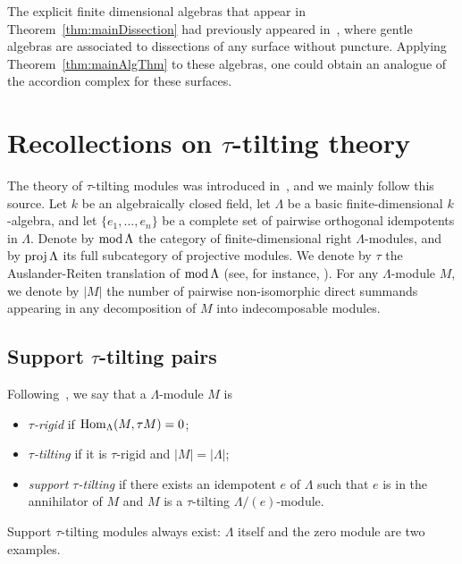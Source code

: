 \documentclass{amsart}
\theoremstyle{definition}
\newcommand{\darkblue}{\color{darkblue}} %
\newcommand{\defn}[1]{\textsl{\darkblue #1}} %
\newcommand{\MOD}{\mbox{{\rm mod \!}}}
\newcommand{\proj}{\operatorname{{\rm proj }}}
\newcommand{\Hom}[1]{\operatorname{{\rm Hom}}_{#1}}
\begin{document}
The explicit finite dimensional algebras that appear in Theorem~\ref{thm:mainDissection} had previously appeared in~\cite{DavidRoeslerSchiffler, DavidRoesler}, where gentle algebras are associated to dissections of any surface without puncture. Applying Theorem~\ref{thm:mainAlgThm} to these algebras, one could obtain an analogue of the accordion complex for these surfaces.



\section{Recollections on $\tau$-tilting theory}
\label{sec:recollections}

\enlargethispage{.1cm}
The theory of $\tau$-tilting modules was introduced in~\cite{AdachiIyamaReiten}, and we mainly follow this source.
Let $k$ be an algebraically closed field, let $\Lambda$ be a basic finite-dimensional $k$-algebra, 
and let $\{e_1, \dots, e_n\}$ be a complete set of pairwise orthogonal idempotents in $\Lambda$.
Denote by $\MOD \Lambda$ the category of finite-dimensional right $\Lambda$-modules, 
and by $\proj \Lambda$ its full subcategory of projective modules.
We denote by $\tau$ the Auslander-Reiten translation of $\MOD \Lambda$ (see, for instance, \cite[Chapter IV]{AssemSimsonSkowronski}).
For any $\Lambda$-module $M$, we denote by $|M|$ the number of pairwise non-isomorphic direct summands appearing 
in any decomposition of $M$ into indecomposable modules.


\subsection{Support $\tau$-tilting pairs}

Following~\cite[Def.~0.1]{AdachiIyamaReiten}, we say that a $\Lambda$-module $M$ is 
\begin{itemize}
 \item \defn{$\tau$-rigid} if $\Hom{\Lambda}(M, \tau M) = 0$;
 \item \defn{$\tau$-tilting} if it is $\tau$-rigid and $|M|=|\Lambda|$;
 \item \defn{support $\tau$-tilting} if there exists an idempotent $e$ of $\Lambda$ such that
       $e$ is in the annihilator of $M$ and $M$ is a $\tau$-tilting $\Lambda/(e)$-module.
\end{itemize}
Support $\tau$-tilting modules always exist: $\Lambda$ itself and the zero module are two examples.
\end{document}
